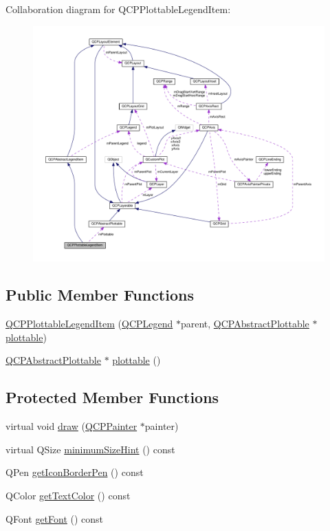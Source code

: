 Collaboration diagram for Q\+C\+P\+Plottable\+Legend\+Item\+:
\nopagebreak
\begin{figure}[H]
\begin{center}
\leavevmode
\includegraphics[width=350pt]{classQCPPlottableLegendItem__coll__graph}
\end{center}
\end{figure}
\subsection*{Public Member Functions}
\begin{DoxyCompactItemize}
\item 
\hyperlink{classQCPPlottableLegendItem_ac1072591fe409d3dabad51b23ee4d6c5}{Q\+C\+P\+Plottable\+Legend\+Item} (\hyperlink{classQCPLegend}{Q\+C\+P\+Legend} $\ast$parent, \hyperlink{classQCPAbstractPlottable}{Q\+C\+P\+Abstract\+Plottable} $\ast$\hyperlink{classQCPPlottableLegendItem_af29e9a2c60b4cba0cac2447b8af7b488}{plottable})
\item 
\hyperlink{classQCPAbstractPlottable}{Q\+C\+P\+Abstract\+Plottable} $\ast$ \hyperlink{classQCPPlottableLegendItem_af29e9a2c60b4cba0cac2447b8af7b488}{plottable} ()
\end{DoxyCompactItemize}
\subsection*{Protected Member Functions}
\begin{DoxyCompactItemize}
\item 
virtual void \hyperlink{classQCPPlottableLegendItem_a68a781c3de4f9959fdf82075052d43aa}{draw} (\hyperlink{classQCPPainter}{Q\+C\+P\+Painter} $\ast$painter)
\item 
virtual Q\+Size \hyperlink{classQCPPlottableLegendItem_a76bad654ebc8e870392f488419a6a483}{minimum\+Size\+Hint} () const 
\item 
Q\+Pen \hyperlink{classQCPPlottableLegendItem_ab36270e6b022a6961fa44136f35c0e4b}{get\+Icon\+Border\+Pen} () const 
\item 
Q\+Color \hyperlink{classQCPPlottableLegendItem_ad762b07439c738660ba93e78c1d03667}{get\+Text\+Color} () const 
\item 
Q\+Font \hyperlink{classQCPPlottableLegendItem_a8a85c8a25affb4895423d730164d61de}{get\+Font} () const 
\end{DoxyCompactItemize}
